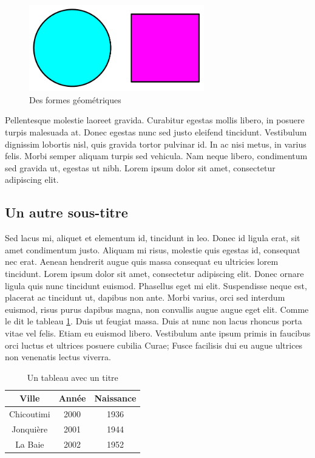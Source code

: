 \begin{figure}
  \begin{center}
  \includegraphics[width=3in]{carre-et-cercle}
  \end{center}
  \caption{Des formes géométriques}
  \label{fig:formes}
\end{figure}

Pellentesque molestie laoreet gravida. Curabitur egestas mollis libero, in
posuere turpis malesuada at. Donec egestas nunc sed justo eleifend
tincidunt. Vestibulum dignissim lobortis nisl, quis gravida tortor pulvinar
id. In ac nisi metus, in varius felis. Morbi semper aliquam turpis sed
vehicula. Nam neque libero, condimentum sed gravida ut, egestas ut nibh.
Lorem ipsum dolor sit amet, consectetur adipiscing elit.

\subsection{Un autre sous-titre}

Sed lacus mi, aliquet et elementum id, tincidunt in leo. Donec id ligula
erat, sit amet condimentum justo. Aliquam mi risus, molestie quis egestas
id, consequat nec erat. Aenean hendrerit augue quis massa consequat eu
ultricies lorem tincidunt. Lorem ipsum dolor sit amet, consectetur
adipiscing elit. Donec ornare ligula quis nunc tincidunt euismod. Phasellus
eget mi elit. Suspendisse neque est, placerat ac tincidunt ut, dapibus non
ante. Morbi varius, orci sed interdum euismod, risus purus dapibus magna,
non convallis augue augue eget elit. Comme le dit le tableau
\ref{tab:villes}. Duis ut feugiat massa. Duis at nunc non lacus rhoncus
porta vitae vel felis. Etiam eu euismod libero. Vestibulum ante ipsum primis
in faucibus orci luctus et ultrices posuere cubilia Curae; Fusce facilisis
dui eu augue ultrices non venenatis lectus viverra.

\begin{table}
  \caption{Un tableau avec un titre}
  \begin{center}
    \begin{tabular}{|c|c|c|}
      \hline
      Ville & Année & Naissance \\
      \hline\hline
      Chicoutimi & 2000 & 1936 \\
      \hline
      Jonquière & 2001 & 1944 \\
      \hline
      La Baie & 2002 & 1952 \\
      \hline
  \end{tabular}
  \label{tab:villes}
  \end{center}
\end{table}

